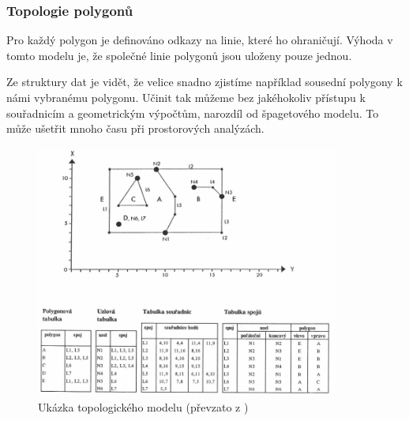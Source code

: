 \subsubsection{Topologie polygonů}
	Pro každý polygon je definováno odkazy na linie, které ho ohraničují. Výhoda v tomto modelu je, že společné linie polygonů jsou uloženy pouze jednou.
	
Ze struktury dat je vidět, že velice snadno zjistíme například sousední polygony k námi vybranému polygonu. Učinit tak můžeme bez jakéhokoliv přístupu k souřadnicím a geometrickým výpočtům, narozdíl od špagetového modelu. To může ušetřit mnoho času při prostorových analýzách.

\begin{figure}[h]
  \centering
  \includegraphics[width=10cm]{./pictures/3/topo_model.png}
  \caption{Ukázka topologického modelu (převzato z \cite{kolar2003geograficke})}
  \label{fig:3-time_complexity}
\end{figure}

